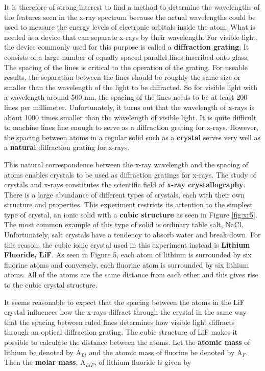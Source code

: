 It is therefore of strong interest to find a method to determine the wavelengths of the features seen in the x-ray spectrum because the actual wavelengths could be used to measure the energy levels of electronic orbitals inside the atom. What is needed is a device that can separate x-rays by their wavelength. For visible light, the device commonly used for this purpose is called a {\bf diffraction grating}. It consists of a large number of equally spaced parallel lines inscribed onto glass. The spacing of the lines is critical to the operation of the grating. For useable results, the separation between the lines should be roughly the same size or smaller than the wavelength of the light to be diffracted. So for visible light with a wavelength around 500 nm, the spacing of the lines needs to be at least 200 lines per millimeter. Unfortunately, it turns out that the wavelength of x-rays is about 1000 times smaller than the wavelength of visible light. It is quite difficult to machine lines fine enough to serve as a diffraction grating for x-rays. However, the spacing between atoms in a regular solid such as a {\bf crystal} serves very well as a {\bf natural} diffraction grating for x-rays.

This natural correspondence between the x-ray wavelength and the spacing of atoms enables crystals to be used as diffraction gratings for x-rays. The study of crystals and x-rays constitutes the scientific field of {\bf x-ray crystallography}. There is a large abundance of different types of crystals, each with their own structure and properties. This experiment restricts its attention to the simplest type of crystal, an ionic solid with a {\bf cubic structure} as seen in Figure \ref{fig:xr5}. The most common example of this type of solid is ordinary table salt, NaCl. Unfortunately, salt crystals have a tendency to absorb water and break down. For this reason, the cubic ionic crystal used in this experiment instead is {\bf Lithium Fluoride, LiF}. As seen in Figure 5, each atom of lithium is surrounded by six fluorine atoms and conversely, each fluorine atom is surrounded by six lithium atoms. All of the atoms are the same distance from each other and this gives rise to the cubic crystal structure.

It seems reasonable to expect that the spacing between the atoms in the LiF crystal influences how the x-rays diffract through the crystal in the same way that the spacing between ruled lines determines how visible light diffracts through an optical diffraction grating. The cubic structure of LiF makes it possible to calculate the distance between the atoms. Let the {\bf atomic mass} of lithium be denoted by A$_{Li}$ and the atomic mass of fluorine be denoted by A$_F$. Then the {\bf molar mass}, A$_{LiF}$, of lithium fluoride is given by

